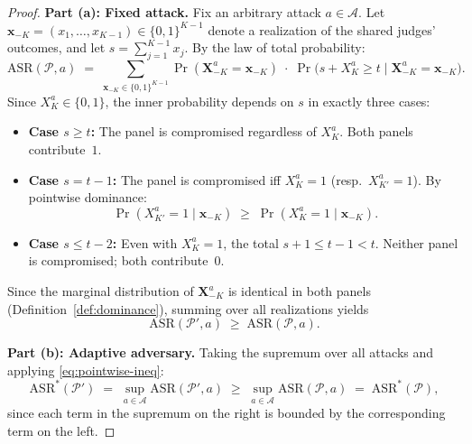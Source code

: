 \documentclass[11pt]{article}
\begin{document}
\begin{proof}
\textbf{Part (a): Fixed attack.}
Fix an arbitrary attack $a \in \mathcal{A}$. Let $\mathbf{x}_{-K} = (x_1, \ldots, x_{K-1}) \in \{0,1\}^{K-1}$ denote a realization of the shared judges' outcomes, and let $s = \sum_{j=1}^{K-1} x_j$. By the law of total probability:
\begin{equation}\label{eq:total-prob}
    \mathrm{ASR}(\mathcal{P}, a)
    \;=\; \sum_{\mathbf{x}_{-K} \in \{0,1\}^{K-1}} \Pr(\mathbf{X}_{-K}^a = \mathbf{x}_{-K})\;\cdot\; \Pr\!\bigl(s + X_K^a \geq t \;\big|\; \mathbf{X}_{-K}^a = \mathbf{x}_{-K}\bigr).
\end{equation}
Since $X_K^a \in \{0,1\}$, the inner probability depends on $s$ in exactly three cases:
\begin{itemize}
    \item \textbf{Case $s \geq t$:} The panel is compromised regardless of $X_K^a$. Both panels contribute~$1$.
    \item \textbf{Case $s = t{-}1$:} The panel is compromised iff $X_K^a = 1$ (resp.\ $X_{K'}^a = 1$). By pointwise dominance:
    \[
        \Pr(X_{K'}^a = 1 \mid \mathbf{x}_{-K}) \;\geq\; \Pr(X_K^a = 1 \mid \mathbf{x}_{-K}).
    \]
    \item \textbf{Case $s \leq t{-}2$:} Even with $X_K^a = 1$, the total $s + 1 \leq t{-}1 < t$. Neither panel is compromised; both contribute~$0$.
\end{itemize}
Since the marginal distribution of $\mathbf{X}_{-K}^a$ is identical in both panels (Definition~\ref{def:dominance}), summing over all realizations yields
\begin{equation}\label{eq:pointwise-ineq}
    \mathrm{ASR}(\mathcal{P}', a) \;\geq\; \mathrm{ASR}(\mathcal{P}, a).
\end{equation}

\medskip
\noindent\textbf{Part (b): Adaptive adversary.}
Taking the supremum over all attacks and applying \eqref{eq:pointwise-ineq}:
\[
    \mathrm{ASR}^*(\mathcal{P}')
    \;=\; \sup_{a \in \mathcal{A}} \mathrm{ASR}(\mathcal{P}', a)
    \;\geq\; \sup_{a \in \mathcal{A}} \mathrm{ASR}(\mathcal{P}, a)
    \;=\; \mathrm{ASR}^*(\mathcal{P}),
\]
since each term in the supremum on the right is bounded by the corresponding term on the left. \qedhere
\end{proof}
\end{document}
